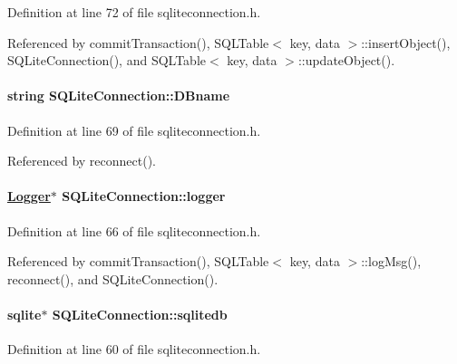 Definition at line 72 of file sqliteconnection.h.

Referenced by commit\-Transaction(), SQLTable$<$ key, data $>$::insert\-Object(), SQLite\-Connection(), and SQLTable$<$ key, data $>$::update\-Object().\hypertarget{classSQLiteConnection_SQLiteConnectiono4}{
\paragraph[DBname]{\setlength{\rightskip}{0pt plus 5cm}string SQLite\-Connection::DBname}\hfill}
\label{classSQLiteConnection_SQLiteConnectiono4}




Definition at line 69 of file sqliteconnection.h.

Referenced by reconnect().\hypertarget{classSQLiteConnection_SQLiteConnectiono2}{
\paragraph[logger]{\setlength{\rightskip}{0pt plus 5cm}\hyperlink{classLogger}{Logger}$\ast$ SQLite\-Connection::logger}\hfill}
\label{classSQLiteConnection_SQLiteConnectiono2}




Definition at line 66 of file sqliteconnection.h.

Referenced by commit\-Transaction(), SQLTable$<$ key, data $>$::log\-Msg(), reconnect(), and SQLite\-Connection().\hypertarget{classSQLiteConnection_SQLiteConnectiono0}{
\paragraph[sqlitedb]{\setlength{\rightskip}{0pt plus 5cm}sqlite$\ast$ SQLite\-Connection::sqlitedb}\hfill}
\label{classSQLiteConnection_SQLiteConnectiono0}




Definition at line 60 of file sqliteconnection.h.


